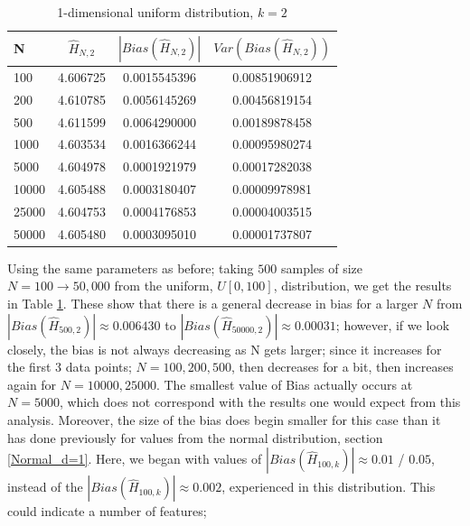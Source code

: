 \documentclass{article}
\begin{document}
\begin{table}
\caption{1-dimensional uniform distribution, $k=2$} \label{uniform_k=2_table}
\begin{center}
\begin{tabular}{| l | c c c|} 
\toprule
N & $\hat{H}_{N, 2}$ & $|Bias(\hat{H}_{N, 2})|$ & $Var(Bias(\hat{H}_{N, 2}))$ \\
\midrule[1pt]
100     & 4.606725     & 0.0015545396     & 0.00851906912  \\
200     & 4.610785     & 0.0056145269     & 0.00456819154  \\
500     & 4.611599     & 0.0064290000     & 0.00189878458  \\
1000    & 4.603534     & 0.0016366244     & 0.00095980274  \\
5000    & 4.604978     & 0.0001921979     & 0.00017282038  \\
10000   & 4.605488     & 0.0003180407     & 0.00009978981  \\
25000   & 4.604753     & 0.0004176853     & 0.00004003515  \\
50000   & 4.605480     & 0.0003095010     & 0.00001737807  \\
\hline
\end{tabular}
\end{center}
\end{table}

Using the same parameters as before; taking $500$ samples of size $N=100 \to 50,000$ from the uniform, $U[0, 100]$, distribution, we get the results in Table \ref{uniform_k=2_table}. These show that there is a general decrease in bias for a larger $N$ from $|Bias(\hat{H}_{500, 2})| \approx  0.006430$ to $|Bias(\hat{H}_{50000, 2})| \approx 0.00031$; however, if we look closely, the bias is not always decreasing as N gets larger; since it increases for the first 3 data points; $N=100, 200 ,500$, then decreases for a bit, then increases again for $N = 10000, 25000$. The smallest value of Bias actually occurs at $N=5000$, which does not correspond with the results one would expect from this analysis. Moreover, the size of the bias does begin smaller for this case than it has done previously for values from the normal distribution, section \ref{Normal_d=1}. Here, we began with values of $|Bias(\hat{H}_{100, k})| \approx 0.01$ / $0.05$, instead of the $|Bias(\hat{H}_{100, k})| \approx 0.002$, experienced in this distribution. This could indicate a number of features;
\end{document}
